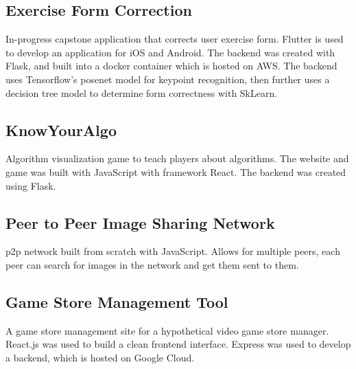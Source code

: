 \documentclass[a4paper, 12pt]{article}
\begin{document}
\subsection {{Exercise Form Correction}\hfill }
In-progress capstone application that corrects user exercise form. Flutter is used to develop an application for iOS and Android. The backend was created with Flask, and built into a docker container which is hosted on AWS. The backend uses Tensorflow's posenet model for keypoint recognition, then further uses a decision tree model to determine form correctness with SkLearn.
\subsection {{}\hfill }

\subsection {{KnowYourAlgo}\hfill }
Algorithm visualization game to teach players about algorithms. The website and game was built with JavaScript with framework React. The backend was created using Flask.
\subsection {{}\hfill }
\subsection {{Peer to Peer Image Sharing Network}\hfill }
p2p network built from scratch with JavaScript. Allows for multiple peers, each peer can search for images in the network and get them sent to them. 

\subsection {{}\hfill }

\subsection {{Game Store Management Tool}\hfill }
A game store management site for a hypothetical video game store manager. React.js was used to build a clean frontend interface. Express was used to develop a backend, which is hosted on Google Cloud. 
\subsection {{}\hfill }
\end{document}
